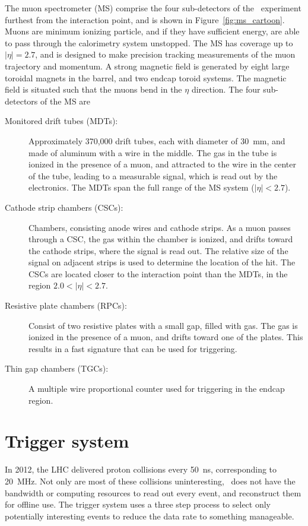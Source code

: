 The muon spectrometer (MS) comprise the four sub-detectors of the
\atlas\ experiment furthest from the interaction point, and is shown in
Figure~\ref{fig:ms_cartoon}.
Muons are minimum ionizing particle, and if they have sufficient energy, are
able to pass through the calorimetry system unstopped.
The MS has coverage up to $|\eta| = 2.7$, and is designed to make precision
tracking measurements of the muon trajectory and momentum.
A strong magnetic field is generated by eight large toroidal magnets in the
barrel, and two endcap toroid systems.
The magnetic field is situated such that the muons bend in the $\eta$
direction.
The four sub-detectors of the MS are
\begin{description}
  \item[Monitored drift tubes (MDTs):] 
    Approximately 370,000 drift tubes, each with diameter of 30~mm, and made of
    aluminum with a wire in the middle.
    The gas in the tube is ionized in the presence of a muon, and attracted to
    the wire in the center of the tube, leading to a measurable signal, which
    is read out by the electronics.
    The MDTs span the full range of the MS system ($|\eta| < 2.7$).
  \item[Cathode strip chambers (CSCs):] 
    Chambers, consisting anode wires and cathode strips.
    As a muon passes through a CSC, the gas within the chamber is ionized, and
    drifts toward the cathode strips, where the signal is read out.
    The relative size of the signal on adjacent strips is used to determine the
    location of the hit.
    The CSCs are located closer to the interaction point than the MDTs, in the
    region $2.0 < |\eta| < 2.7$.
  \item[Resistive plate chambers (RPCs):] 
    Consist of two resistive plates with a small gap, filled with gas.
    The gas is ionized in the presence of a muon, and drifts toward one of the
    plates.
    This results in a fast signature that can be used for triggering.
  \item[Thin gap chambers (TGCs):] 
    A multiple wire proportional counter used for triggering in the endcap
    region.
\end{description}

\FloatBarrier
\section{Trigger system}

In 2012, the LHC delivered proton collisions every 50~ns, corresponding to
20~MHz.
Not only are most of these collisions uninteresting, \atlas\ does not have
the bandwidth or computing resources to read out every event, and reconstruct
them for offline use.
The trigger system uses a three step process to select only potentially
interesting events to reduce the data rate to something manageable.

